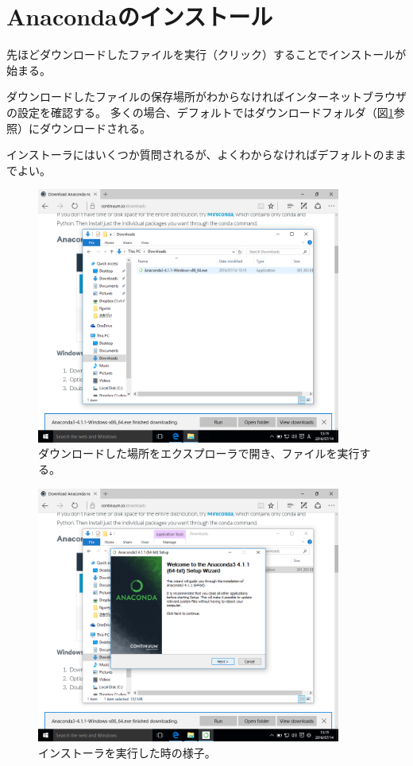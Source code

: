 \section{Anacondaのインストール}
先ほどダウンロードしたファイルを実行（クリック）することでインストールが始まる。

ダウンロードしたファイルの保存場所がわからなければインターネットブラウザの設定を確認する。
多くの場合、デフォルトではダウンロードフォルダ（図\ref{fig:Anaconda_install1}参照）にダウンロードされる。

インストーラにはいくつか質問されるが、よくわからなければデフォルトのままでよい。

\begin{figure}
	\centering
	\includegraphics[width=10cm]{TeX_files/fig_python_install/Anaconda_install.png}
	\caption{
		\label{fig:Anaconda_install1}
		ダウンロードした場所をエクスプローラで開き、ファイルを実行する。
	}
\end{figure}

\begin{figure}
	\centering
	\includegraphics[width=10cm]{TeX_files/fig_python_install/Anaconda_install2.png}
	\caption{
		\label{fig:Anaconda_install2}
		インストーラを実行した時の様子。
	}
\end{figure}

